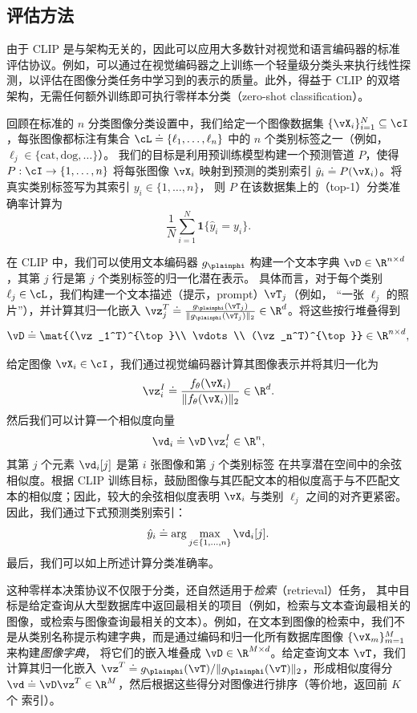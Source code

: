 \documentclass[../../book-main_zh.tex]{subfiles}
\begin{document}
\subsection{评估方法}\label{sub:clip_eval}
由于 CLIP 是与架构无关的，因此可以应用大多数针对视觉和语言编码器的标准评估协议。例如，可以通过在视觉编码器之上训练一个轻量级分类头来执行线性探测，以评估在图像分类任务中学习到的表示的质量。此外，得益于 CLIP 的双塔架构，无需任何额外训练即可执行零样本分类（zero-shot classification）。

回顾在标准的 \(n\) 分类图像分类设置中，我们给定一个图像数据集
\(\{\vX_i\}_{i=1}^{N}\subseteq\cI\)，每张图像都标注有集合
\(\cL \doteq \{\ell_1,\ldots,\ell_n\}\) 中的 \(n\) 个类别标签之一（例如，\(\ell_j \in \{\text{cat},\text{dog},\ldots\}\)）。
我们的目标是利用预训练模型构建一个预测管道 \(P\)，使得
\(P:\cI\to\{1,\ldots,n\}\) 将每张图像 \(\vX_i\) 映射到预测的类别索引
\(\hat{y}_i \doteq P(\vX_i)\)。将真实类别标签写为其索引 \(y_i \in \{1,\ldots,n\}\)，
则 \(P\) 在该数据集上的（top-1）分类准确率计算为
\[
\frac{1}{N}\sum_{i=1}^{N}\boldsymbol{1}\{\hat{y}_i = y_i\}.
\]

在 CLIP 中，我们可以使用文本编码器 \(g_{\plainphi}\) 构建一个文本字典 \(\vD\in\R^{n\times d}\)，其第 \(j\) 行是第 \(j\) 个类别标签的归一化潜在表示。
具体而言，对于每个类别 \(\ell_j \in \cL\)，我们构建一个文本描述（提示，prompt）\(\vT_j\)（例如，
“一张 \(\ell_j\) 的照片”），并计算其归一化嵌入
\(\vz_j^T \doteq \frac{g_{\plainphi}(\vT_j)}{\|g_{\plainphi}(\vT_j)\|_2} \in \R^{d}\)。将这些按行堆叠得到
\[
\vD \doteq 
\mat{(\vz_1^T)^{\top}\\ \vdots \\ (\vz_n^T)^{\top}}
\in \R^{n\times d},
\]

给定图像 \(\vX_i \in \cI\)，我们通过视觉编码器计算其图像表示并将其归一化为
\[
\vz_i^I \doteq \frac{f_{\theta}(\vX_i)}{\|f_{\theta}(\vX_i)\|_2} \in \R^{d}.
\]
然后我们可以计算一个相似度向量
\[
\vd_i \doteq \vD\,\vz_i^I \in \R^{n},
\]
其第 \(j\) 个元素 \(\vd_i[j]\) 是第 \(i\) 张图像和第 \(j\) 个类别标签
在共享潜在空间中的余弦相似度。根据 CLIP 训练目标，鼓励图像与其匹配文本的相似度高于与不匹配文本的相似度；因此，较大的余弦相似度表明
\(\vX_i\) 与类别 \(\ell_j\) 之间的对齐更紧密。因此，我们通过下式预测类别索引：
\[
\hat{y}_i \doteq \arg\max_{j \in \{1,\ldots,n\}} \vd_i[j].
\]
最后，我们可以如上所述计算分类准确率。 

这种零样本决策协议不仅限于分类，还自然适用于\emph{检索}（retrieval）任务，
其中目标是给定查询从大型数据库中返回最相关的项目（例如，检索与文本查询最相关的图像，或检索与图像查询最相关的文本）。例如，在文本到图像的检索中，我们不是从类别名称提示构建字典，而是通过编码和归一化所有数据库图像 \(\{\vX_m\}_{m=1}^{M}\) 来构建\emph{图像字典}，
将它们的嵌入堆叠成
\(\vD\in\R^{M\times d}\)。给定查询文本 \(\vT\)，我们计算其归一化嵌入
\(\vz^T \doteq g_{\plainphi}(\vT)/\|g_{\plainphi}(\vT)\|_2\)，形成相似度得分
\(\vd \doteq \vD\vz^T\in\R^{M}\)，然后根据这些得分对图像进行排序（等价地，返回前 \(K\) 个
索引）。 
\end{document}
